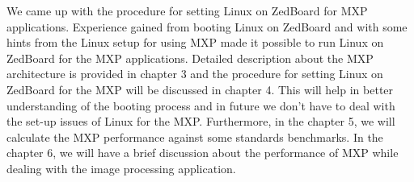We came up with the procedure for setting Linux on ZedBoard for MXP applications. Experience gained from booting Linux on ZedBoard \cite{18} and with some hints from the Linux setup for using MXP \cite{19} made it possible to run Linux on ZedBoard for the MXP applications. Detailed description about the MXP architecture is provided in chapter 3 and the procedure for setting Linux on ZedBoard for the MXP will be discussed in chapter 4. This will help in better understanding of the booting process and in future we don’t have to deal with the set-up issues of Linux for the MXP. Furthermore, in the chapter 5, we will calculate the MXP performance against some standards benchmarks. In the chapter 6, we will have a brief discussion about the performance of MXP while dealing with the image processing application.  

